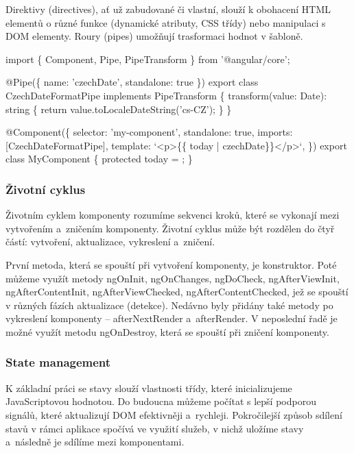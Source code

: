 Direktivy (directives), ať už zabudované či vlastní, slouží k obohacení HTML elementů o různé funkce (dynamické atributy, CSS třídy) nebo manipulaci s DOM elementy. 
Roury (pipes) umožňují trasformaci hodnot v šabloně.\cite{angulardev,angulario}

\begin{prog}
import \{ Component, Pipe, PipeTransform \} from '@angular/core';

@Pipe(\{ name: 'czechDate', standalone: true \})
export class CzechDateFormatPipe implements PipeTransform \{
  transform(value: Date): string \{
    return value.toLocaleDateString('cs-CZ');
  \}
\}

@Component(\{
  selector: 'my-component',
  standalone: true,
  imports: [CzechDateFormatPipe],
  template: `<p>\{\{ today | czechDate\}\}</p>`,
\})
export class MyComponent \{
  protected today = ;
\}
\end{prog}

\subsubsection{Životní cyklus}

Životním cyklem komponenty rozumíme sekvenci kroků, které se vykonají mezi vytvořením a~zničením komponenty. 
Životní cyklus může být rozdělen do čtyř částí: vytvoření, aktualizace, vykreslení a~zničení. 

První metoda, která se spouští při vytvoření komponenty, je konstruktor. 
Poté můžeme využít metody ngOnInit, ngOnChanges, ngDoCheck, ngAfterViewInit, ngAfterContentInit, ngAfterViewChecked, ngAfterContentChecked, jež se spouští v různých fázích aktualizace (detekce). 
Nedávno byly přidány také metody po vykreslení komponenty -- afterNextRender a~afterRender. V neposlední řadě je možné využít metodu ngOnDestroy, která se spouští při zničení komponenty.\cite{angulardev,learningangular} 

\subsubsection{State management}

K základní práci se stavy slouží vlastnosti třídy, které inicializujeme JavaScriptovou hodnotou. 
Do budoucna můžeme počítat s lepší podporou signálů, které aktualizují DOM efektivněji a~rychleji. 
Pokročilejší způsob sdílení stavů v rámci aplikace spočívá ve využití služeb, v nichž uložíme stavy a~následně je sdílíme mezi komponentami.\cite{angulardev}

